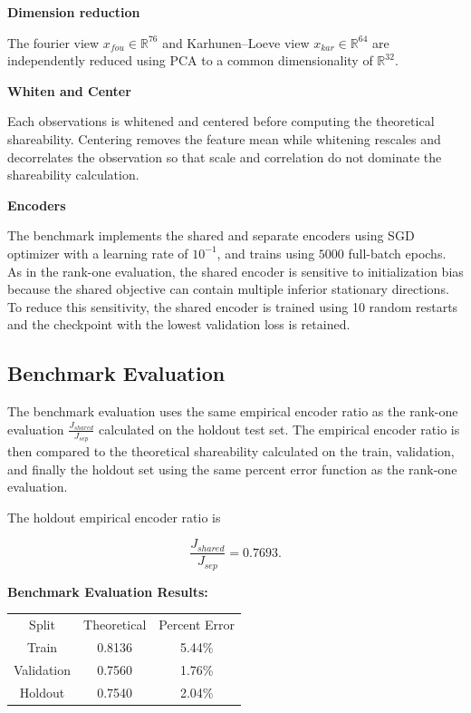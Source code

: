 \documentclass{article}
\begin{document}
\textbf{Dimension reduction}

The fourier view $x_{fou} \in \mathbb{R}^{76}$ and Karhunen--Loeve view $x_{kar} \in \mathbb{R}^{64}$ are independently reduced using PCA to a common dimensionality of $\mathbb{R}^{32}$.

\textbf{Whiten and Center}

Each observations is whitened and centered before computing the theoretical shareability. Centering removes the feature mean while whitening rescales and decorrelates the observation so that scale and correlation do not dominate the shareability calculation. 

\textbf{Encoders}

The benchmark implements the shared and separate encoders using SGD optimizer with a learning rate of \(10^{-1}\), and trains using \(5000\) full-batch epochs. As in the rank-one evaluation, the shared encoder is sensitive to initialization bias because the shared objective can contain multiple inferior stationary directions. To reduce this sensitivity, the shared encoder is trained using 10 random restarts and the checkpoint with the lowest validation loss is retained.

\subsection{Benchmark Evaluation}

The benchmark evaluation uses the same empirical encoder ratio as the rank-one evaluation \(\frac{J_{shared}}{J_{sep}}\) calculated on the holdout test set. The empirical encoder ratio is then compared to the theoretical shareability calculated on the train, validation, and finally the holdout set using the same percent error function as the rank-one evaluation.

The holdout empirical encoder ratio is

\[
\frac{J_{shared}}{J_{sep}} = 0.7693.
\]

\textbf{Benchmark Evaluation Results:}

\begin{table}[H]
    \centering
    \begin{tabular}{c|c|c}
        Split & Theoretical & Percent Error \\
        Train & 0.8136 & 5.44\% \\
        Validation & 0.7560 & 1.76\% \\
        Holdout & 0.7540 & 2.04\% \\
    \end{tabular}
\end{table}
\end{document}
